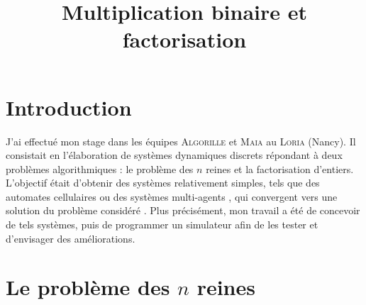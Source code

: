 \documentclass[11pt, openany, a4paper]{article}
\newcommand{\ANNOT}[1]{
  ~\linebreak
  \centerline{
    \large\fcolorbox{black}{bleuclair}{
      \begin{minipage}[h]{.8\linewidth}
      #1
      \end{minipage}
    }
  }
}
\begin{document}
\renewcommand{\labelitemi}{$\bullet$}

\title{\vspace{-3em}Multiplication binaire et factorisation}
\date{}



\maketitle

% 

\part*{Introduction}

J'ai effectué mon stage dans les équipes \textsc{Algorille} et \textsc{Maia} au \textsc{Loria} (Nancy). Il consistait en l'élaboration de systèmes dynamiques discrets répondant à deux problèmes algorithmiques : le problème des $n$ reines et la factorisation d'entiers. L'objectif était d'obtenir des systèmes relativement simples, tels que des automates cellulaires ou des systèmes multi-agents \cite{ChevFat08}, qui convergent vers une solution du problème considéré \cite{BahiC06}. Plus précisément, mon travail a été de concevoir de tels systèmes, puis de programmer un simulateur afin de les tester et d'envisager des améliorations.


\part*{Le problème des $n$ reines}
\label{part:nreines}




\setcounter{section}{0}
\end{document}
